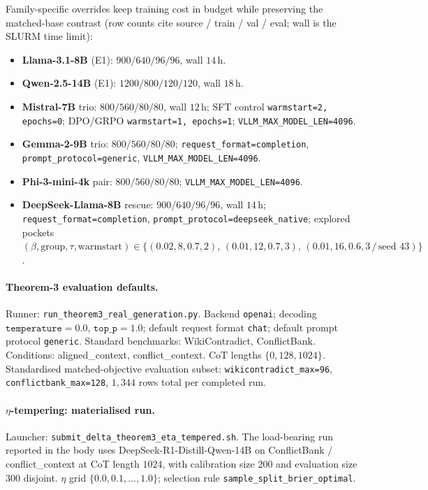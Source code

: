 Family-specific overrides keep training cost in budget while preserving
the matched-base contrast (row counts cite source / train / val / eval;
wall is the SLURM time limit):
\label{tab:matched-base-overrides}%
\begin{itemize}[leftmargin=14pt,itemsep=1pt,topsep=2pt,parsep=0pt]
  \item \textbf{Llama-3.1-8B} (E1): $900/640/96/96$, wall $14$\,h.
  \item \textbf{Qwen-2.5-14B} (E1): $1200/800/120/120$, wall $18$\,h.
  \item \textbf{Mistral-7B} trio: $800/560/80/80$, wall $12$\,h; SFT control \texttt{warmstart=2, epochs=0}; DPO/GRPO \texttt{warmstart=1, epochs=1}; \texttt{VLLM\_MAX\_MODEL\_LEN=4096}.
  \item \textbf{Gemma-2-9B} trio: $800/560/80/80$; \texttt{request\_format=completion}, \texttt{prompt\_protocol=generic}, \texttt{VLLM\_MAX\_MODEL\_LEN=4096}.
  \item \textbf{Phi-3-mini-4k} pair: $800/560/80/80$; \texttt{VLLM\_MAX\_MODEL\_LEN=4096}.
  \item \textbf{DeepSeek-Llama-8B} rescue: $900/640/96/96$, wall $14$\,h; \texttt{request\_format=completion}, \texttt{prompt\_protocol=deepseek\_native}; explored pockets $(\beta,\text{group},\tau,\text{warmstart})\!\in\!\{(0.02,8,0.7,2),\,(0.01,12,0.7,3),\,(0.01,16,0.6,3{\,/\,}\text{seed }43)\}$.
\end{itemize}

\paragraph{Theorem-3 evaluation defaults.}
Runner: \texttt{run\_theorem3\_real\_generation.py}.  Backend
\texttt{openai}; decoding $\texttt{temperature}=0.0$,
$\texttt{top\_p}=1.0$; default request format \texttt{chat}; default
prompt protocol \texttt{generic}.  Standard benchmarks:
WikiContradict, ConflictBank.  Conditions: aligned\_context,
conflict\_context.  CoT lengths $\{0, 128, 1024\}$.
Standardised matched-objective evaluation subset:
\texttt{wikicontradict\_max=96}, \texttt{conflictbank\_max=128},
$1{,}344$ rows total per completed run.

\paragraph{$\eta$-tempering: materialised run.}
Launcher: \texttt{submit\_delta\_theorem3\_eta\_tempered.sh}.
The load-bearing run reported in the body uses
DeepSeek-R1-Distill-Qwen-14B on ConflictBank / conflict\_context
at CoT length $1024$, with calibration size $200$ and evaluation
size $300$ disjoint.  $\eta$ grid $\{0.0, 0.1, \ldots, 1.0\}$;
selection rule \texttt{sample\_split\_brier\_optimal}.

